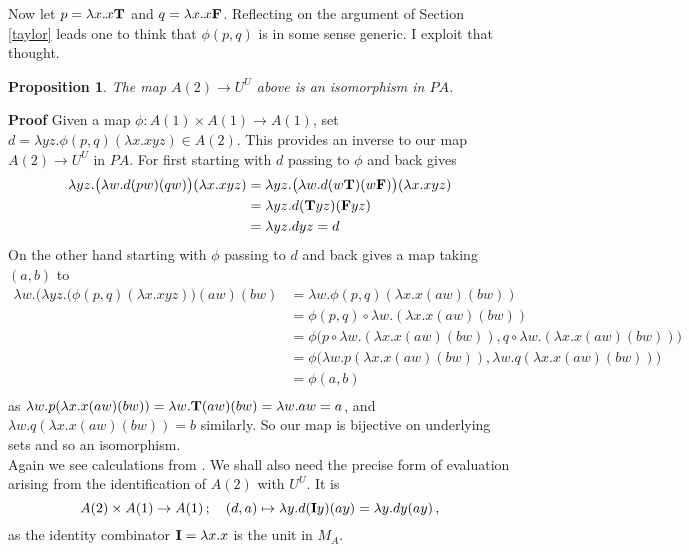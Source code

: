 \documentclass[12pt, amstex, amssymb]{article}
\newtheorem{proposition}[theorem]{Proposition}
\begin{document}
Now let $p = \lambda x. x{\bf T}$ and $q = \lambda x. x{\bf F}$. Reflecting on
the argument of Section \ref{taylor} leads one to think that 
$\phi(p,q)$ is in some sense generic.
I exploit that thought.
\begin{proposition} The map $A(2) \to U^U$ above is an isomorphism
in $PA$.
\end{proposition}
{\bf Proof}
Given a map $\phi : A(1) \times A(1) \to A(1)$, set
$d = \lambda yz. \phi(p,q)(\lambda x. xyz) \in A(2)$. This provides an
inverse to our map $A(2) \to U^U$ in $PA$. 
For first starting with $d$ passing to $\phi$
and back gives
\begin{equation*}
\begin{split}
\lambda yz.\big( \lambda w. d (pw)(qw)\big) (\lambda x.xyz) & =
\lambda yz.\big( \lambda w. d (w{\bf T})(w{\bf F})\big)(\lambda x.xyz) \\
& = \lambda yz. d({\bf T}yz)({\bf F}yz) \\
& = \lambda yz. dyz = d \\ 
\end{split}
\end{equation*}
On the other hand starting with $\phi$ passing to $d$ and back
gives a map taking $(a,b)$ to
\begin{equation*}
\begin{split}
\lambda w.\big( \lambda yz.(\phi (p,q)(\lambda x.xyz)\big) (aw)(bw)& =
\lambda w.\phi (p,q)(\lambda x.x(aw)(bw))\\
& = \phi (p,q) \circ \lambda w.(\lambda x.x(aw)(bw))\\
& =  \phi \big( p \circ \lambda w.(\lambda x.x(aw)(bw)),q \circ 
\lambda w.(\lambda x.x(aw)(bw)) \big) \\
& =  \phi \big( \lambda w.p(\lambda x.x(aw)(bw)), 
\lambda w.q(\lambda x.x(aw)(bw)) \big) \\
& = \phi(a,b)\\
\end{split}
\end{equation*}
as
$\lambda w.p(\lambda x.x(aw)(bw))
= \lambda w.{\bf T}(aw)(bw) = \lambda w.aw = a$,
and
$\lambda w.q(\lambda x.x(aw)(bw)) = b$ similarly.
So our map is bijective on underlying sets and so an isomorphism.\\[0.3em]
Again we see calculations from \cite{Koy84}.
We shall also need the precise form of evaluation arising from the 
identification of $A(2)$ with $U^U$. It is
\[
A(2) \times A(1) \to A(1) \, ; \quad (d,a) \mapsto 
\lambda y. d({\bf I}y)(ay) =
\lambda y. dy(ay) \, ,
\]
as the identity combinator ${\bf I} = \lambda x.x$ is the unit
in $M_A$.
\end{document}
